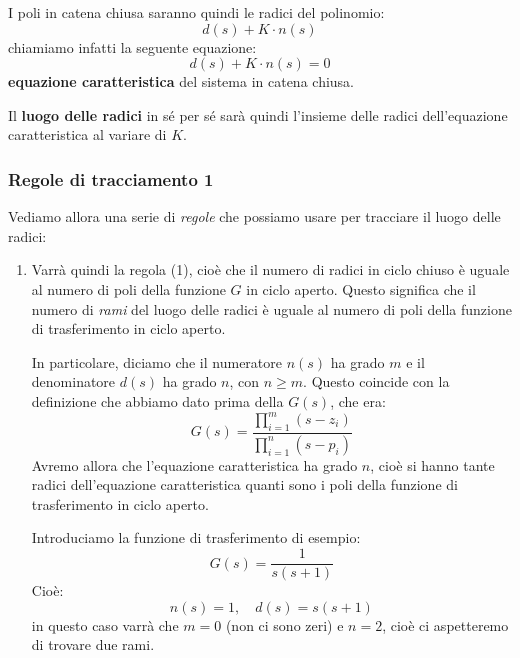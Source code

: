 \documentclass[a4paper,11pt]{article}
\begin{document}
I poli in catena chiusa saranno quindi le radici del polinomio:
$$
d(s) + K \cdot n(s)
$$
chiamiamo infatti la seguente equazione:
$$
d(s) + K \cdot n(s) = 0
$$
\textbf{equazione caratteristica} del sistema in catena chiusa.

Il \textbf{luogo delle radici} in sé per sé sarà quindi l'insieme delle radici dell'equazione caratteristica al variare di $K$.

\subsubsection{Regole di tracciamento 1}
Vediamo allora una serie di \textit{regole} che possiamo usare per tracciare il luogo delle radici:

\begin{enumerate}
	\item 
		Varrà quindi la regola (1), cioè che il numero di radici in ciclo chiuso è uguale al numero di poli della funzione $G$ in ciclo aperto.
		Questo significa che il numero di \textit{rami} del luogo delle radici è uguale al numero di poli della funzione di trasferimento in ciclo aperto.

		In particolare, diciamo che il numeratore $n(s)$ ha grado $m$ e il denominatore $d(s)$ ha grado $n$, con $n \geq m$.
		Questo coincide con la definizione che abbiamo dato prima della $G(s)$, che era:
		$$
		G(s) = \frac{\prod_{i = 1}^m (s - z_i)}{\prod_{i = 1}^n (s - p_i)}
		$$
		Avremo allora che l'equazione caratteristica ha grado $n$, cioè si hanno tante radici dell'equazione caratteristica quanti sono i poli della funzione di trasferimento in ciclo aperto.

		\par\medskip
		\noindent
		\textbf{}

		Introduciamo la funzione di trasferimento di esempio:
		$$
		G(s) = \frac{1}{s (s + 1)}
		$$
		Cioè:
		$$
		n(s) = 1, \quad d(s) = s(s + 1)
		$$
		in questo caso varrà che $m = 0$ (non ci sono zeri) e $n = 2$, cioè ci aspetteremo di trovare due rami.


\end{enumerate}
\end{document}
